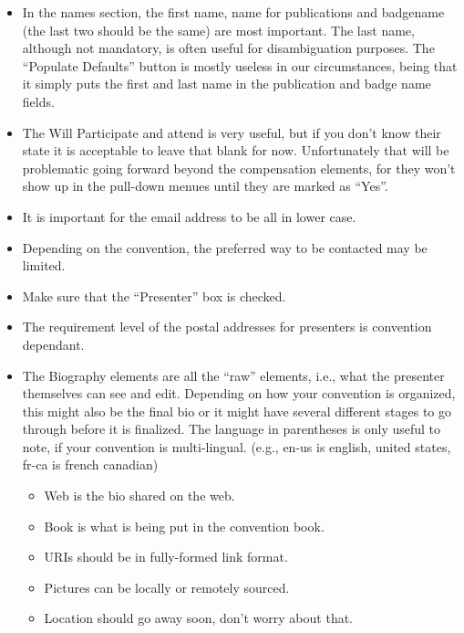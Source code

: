\documentclass[tablesignature]{scrartcl}
\begin{document}
\begin{itemize}
\item In the names section, the first name, name for publications and
     badgename (the last two should be the same) are most
     important. The last name, although not mandatory, is often useful
     for disambiguation purposes.  The ``Populate Defaults'' button is
     mostly useless in our circumstances, being that it simply puts
     the first and last name in the publication and badge name
     fields.
\item The Will Participate and attend is very useful, but if you don't
     know their state it is acceptable to leave that blank for now.
     Unfortunately that will be problematic going forward beyond the
     compensation elements, for they won't show up in the pull-down
     menues until they are marked as ``Yes''.
\item It is important for the email address to be all in lower case.
\item Depending on the convention, the preferred way to be contacted
     may be limited.
\item Make sure that the ``Presenter'' box is checked.
\item The requirement level of the postal addresses for presenters is
     convention dependant.
\item The Biography elements are all the ``raw'' elements, i.e., what the
     presenter themselves can see and edit.  Depending on how your
     convention is organized, this might also be the final bio or it
     might have several different stages to go through before it is
     finalized.  The language in parentheses is only useful to note,
     if your convention is multi-lingual. (e.g., en-us is english,
     united states, fr-ca is french canadian)

\begin{itemize}
\item Web is the bio shared on the web.
\item Book is what is being put in the convention book.
\item URIs should be in fully-formed link format.
\item Pictures can be locally or remotely sourced.
\item Location should go away soon, don't worry about that.
\end{itemize}


\end{itemize}
\end{document}
